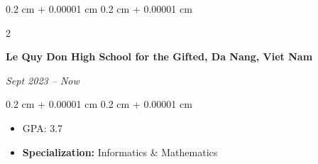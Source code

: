 \documentclass[10pt, letterpaper]{article}
\newenvironment{highlights}{
    \begin{itemize}[
        topsep=0.10 cm,
        parsep=0.10 cm,
        partopsep=0pt,
        itemsep=0pt,
        leftmargin=0.4 cm + 10pt
    ]
}{
    \end{itemize}
} %
\newenvironment{onecolentry}{
    \begin{adjustwidth}{
        0.2 cm + 0.00001 cm
    }{
        0.2 cm + 0.00001 cm
    }
}{
    \end{adjustwidth}
} %
\newenvironment{twocolentry}[2][]{
    \onecolentry
    \def\secondColumn{#2}
    \setcolumnwidth{\fill, 4.5 cm}
    \begin{paracol}{2}
}{
    \switchcolumn \raggedleft \secondColumn
    \end{paracol}
    \endonecolentry
} %
\let\hrefWithoutArrow\href
\renewcommand{\href}[2]{\hrefWithoutArrow{#1}{\ifthenelse{\equal{#2}{}}{ }{#2 }\raisebox{.15ex}{\footnotesize \faExternalLink*}}}
\begin{document}
        
        \begin{twocolentry}{
            
            
        \textit{Sept 2023 – Now}}
            \textbf{Le Quy Don High School for the Gifted, Da Nang, Viet Nam}

        \end{twocolentry}

        \vspace{0.10 cm}
        \begin{onecolentry}
            \begin{highlights}
                \item GPA: 3.7
                \item \textbf{Specialization:} Informatics \& Mathematics
            \end{highlights}
        \end{onecolentry}



    



        
            
            

\end{document}
